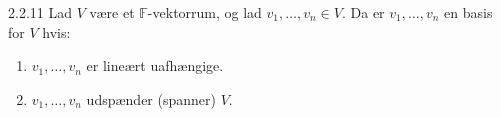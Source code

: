 \begin{definition}{2.2.11}
	Lad $V$ være et $\mathbb{F}$-vektorrum, og lad $v_1, \dots, v_n \in V$. Da
	er $v_1, \dots, v_n$ en basis for $V$ hvis:
	\begin{enumerate}
		\item $v_1, \dots, v_n$ er lineært uafhængige.
		\item $v_1, \dots, v_n$ udspænder (spanner) $V$.
	\end{enumerate}
\end{definition}
